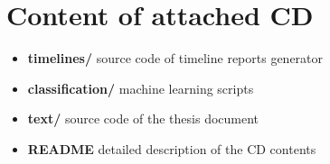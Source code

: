 





\chapter{Content of attached CD}
\begin{itemize}
\item \textbf{timelines/} source code of timeline reports generator
\item \textbf{classification/} machine learning scripts
\item \textbf{text/} source code of the thesis document
\item \textbf{README} detailed description of the CD contents
\end{itemize}